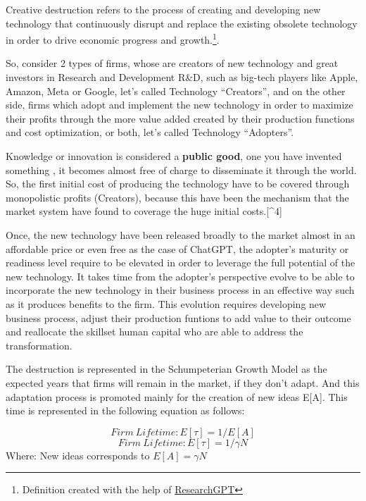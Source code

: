 \documentclass[preprint, 3p,
authoryear]{elsarticle} %
\begin{document}
Creative destruction refers to the process of creating and developing
new technology that continuously disrupt and replace the existing
obsolete technology in order to drive economic progress and
growth.\footnote{Definition created with the help of
  \href{https://github.com/mukulpatnaik/researchgpt.git}{ResearchGPT}}.

So, consider 2 types of firms, whose are creators of new technology and
great investors in Research and Development R\&D, such as big-tech
players like Apple, Amazon, Meta or Google, let's called Technology
``Creators'', and on the other side, firms which adopt and implement the
new technology in order to maximize their profits through the more value
added created by their production functions and cost optimization, or
both, let's called Technology ``Adopters''.

Knowledge or innovation is considered a \textbf{public good}, one you
have invented something , it becomes almost free of charge to
disseminate it through the world. So, the first initial cost of
producing the technology have to be covered through monopolistic profits
(Creators), because this have been the mechanism that the market system
have found to coverage the huge initial costs.{[}\^{}4{]}

Once, the new technology have been released broadly to the market almost
in an affordable price or even free as the case of ChatGPT, the
adopter's maturity or readiness level require to be elevated in order to
leverage the full potential of the new technology. It takes time from
the adopter's perspective evolve to be able to incorporate the new
technology in their business process in an effective way such as it
produces benefits to the firm. This evolution requires developing new
business process, adjust their production funtions to add value to their
outcome and reallocate the skillset human capital who are able to
address the transformation.

The destruction is represented in the Schumpeterian Growth Model as the
expected years that firms will remain in the market, if they don't
adapt. And this adaptation process is promoted mainly for the creation
of new ideas E{[}A{]}. This time is represented in the following
equation as follows:

\[
Firm \ Lifetime: E[\tau] = 1/E[A]
\] \[
Firm \ Lifetime: E[\tau] = 1/\gamma N
\] Where: New ideas corresponds to \(E[A] = \gamma N\)
\end{document}
